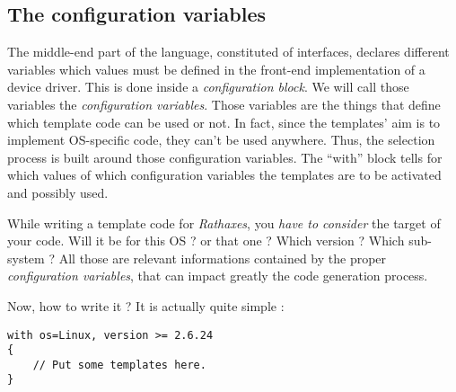 \documentclass[american]{rtxreport}
\begin{document}
\subsection{The configuration variables}

The middle-end part of the language, constituted of interfaces, declares
different variables which values must be defined in the front-end
implementation of a device driver. This is done inside a \emph{configuration
block}. We will call those variables the \emph{configuration variables}.  Those
variables are the things that define which template code can be used or not. In
fact, since the templates' aim is to implement OS-specific code, they can't be
used anywhere. Thus, the selection process is built around those configuration
variables. The “with” block tells for which values of which configuration
variables the templates are to be activated and possibly used.

While writing a template code for \emph{Rathaxes}, you \emph{have to consider}
the target of your code. Will it be for this OS ? or that one ? Which version ?
Which sub-system ? All those are relevant informations contained by the proper
\emph{configuration variables}, that can impact greatly the code generation
process.

Now, how to write it ? It is actually quite simple :
\begin{lstlisting}
with os=Linux, version >= 2.6.24
{
    // Put some templates here.
}
\end{lstlisting}
\end{document}
